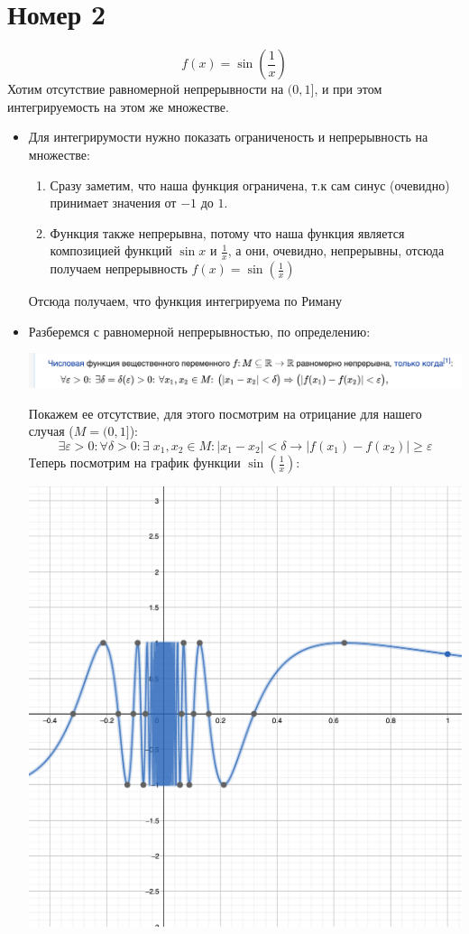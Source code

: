 \documentclass[a4paper,12pt]{article}
\begin{document}
\section*{Номер 2}
\[
f(x) = \sin \left(\frac{1}{x}\right)
\]
Хотим отсутствие равномерной непрерывности на $(0, 1]$,  и при этом интегрируемость на этом же множестве.
\begin{itemize}
\item
Для интегрирумости нужно показать ограниченость и непрерывность на множестве:
\begin{enumerate}
\item
Сразу заметим, что наша функция ограничена, т.к  сам синус (очевидно) принимает значения от $-1$ до $1$.
\item
Функция также непрерывна, потому что наша функция является композицией функций $\sin x$ и $\frac{1}{x}$, а они, очевидно, непрерывны, отсюда получаем непрерывность $f(x) = \sin \left(\frac{1}{x}\right)$
\end{enumerate}
Отсюда получаем, что функция интегрируема по Риману
\item Разберемся с равномерной непрерывностью, по определению:
\begin{center}
\includegraphics[scale=0.4]{1.png}
\end{center}
Покажем ее отсутствие, для этого посмотрим на отрицание для нашего случая ($M = (0, 1]$):
\[
\exists \varepsilon > 0 : \forall \delta > 0 : \exists \; x_1, x_2 \in M : |x_1 - x_2| < \delta   \rightarrow |f(x_1) - f(x_2)| \geq  \varepsilon
\]
\clearpage
Теперь посмотрим на график функции $\sin(\frac{1}{x})$:
\begin{center}
\includegraphics[scale=0.3]{2.png}

\end{center}
\end{itemize}
\end{document}
